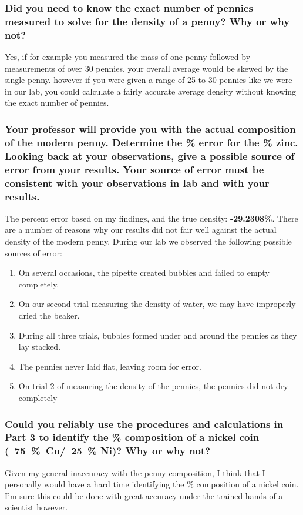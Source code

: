 \documentclass[a4paper,10pt]{article}
\begin{document}
  \subsubsection*{Did you need to know the exact number of pennies measured to solve for the density of a penny? Why or why not?}

    Yes, if for example you measured the mass of one penny followed by measurements of over 30 pennies, your overall average would be skewed by the single penny. however if you were given a range of 25 to 30 pennies like we were in our lab, you could calculate a fairly accurate average density without knowing the exact number of pennies. 

  \subsubsection*{Your professor will provide you with the actual composition of the modern penny. Determine the \% error for the \% zinc. Looking back at your observations, give a possible source of error from your results. Your source of error must be consistent with your observations in lab and with your results.}
    The percent error based on my findings, and the true density: \textbf{-29.2308\%}. There are a number of reasons why our results did not fair well against the actual density of the modern penny. During our lab we observed the following possible sources of error: 

    \begin{enumerate}
        \item On several occasions, the pipette created bubbles and failed to empty completely. 
        \item On our second trial measuring the density of water, we may have improperly dried the beaker.
        \item During all three trials, bubbles formed under and around the pennies as they lay stacked.
        \item The pennies never laid flat, leaving room for error.
        \item On trial 2 of measuring the density of the pennies, the pennies did not dry completely
      \end{enumerate}

  \subsubsection*{Could you reliably use the procedures and calculations in Part 3 to identify the \% composition of a nickel coin (~75~\%~Cu/~25~\% Ni)? Why or why not?}
      Given my general inaccuracy with the penny composition, I think that I personally would have a hard time identifying the \% composition of a nickel coin. I'm sure this could be done with great accuracy under the trained hands of a scientist however.  
\end{document}
